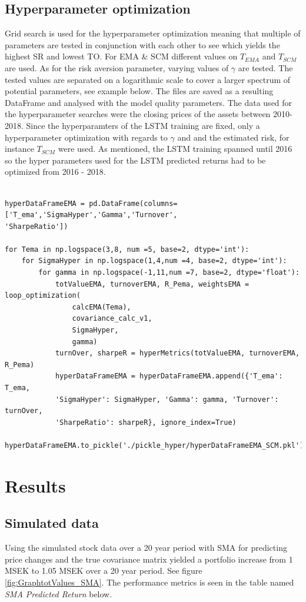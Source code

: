 \documentclass[final]{LTHtwocol} %
\begin{document}
\subsection{Hyperparameter optimization}
Grid search is used for the hyperparameter optimization meaning that multiple of parameters are tested in conjunction with each other to see which yields the highest SR and lowest TO. For EMA \& SCM different values on $T_{EMA}$ and $T_{SCM}$ are used. As for the risk aversion parameter, varying values of $\gamma$ are tested. The tested values are separated on a logarithmic scale to cover a larger spectrum of potential parameters, see example below. The files are saved as a resulting DataFrame and analysed with the model quality parameters. The data used for the hyperparameter searches were the closing prices of the assets between 2010-2018. 
Since the hyperparamters of the LSTM training are fixed, only a hyperparameter optimization with regards to $\gamma$ and and the estimated risk, for instance $T_{SCM}$ were used. As mentioned, the LSTM training spanned until 2016 so the hyper parameters used for the LSTM predicted returns had to be optimized from 2016 - 2018.

\begin{verbatim}
  
hyperDataFrameEMA = pd.DataFrame(columns=['T_ema','SigmaHyper','Gamma','Turnover',
'SharpeRatio'])

for Tema in np.logspace(3,8, num =5, base=2, dtype='int'):
    for SigmaHyper in np.logspace(1,4,num =4, base=2, dtype='int'):
        for gamma in np.logspace(-1,11,num =7, base=2, dtype='float'): 
            totValueEMA, turnoverEMA, R_Pema, weightsEMA = loop_optimization(
                calcEMA(Tema), 
                covariance_calc_v1, 
                SigmaHyper,
                gamma)
            turnOver, sharpeR = hyperMetrics(totValueEMA, turnoverEMA, R_Pema)
            hyperDataFrameEMA = hyperDataFrameEMA.append({'T_ema': T_ema,
            'SigmaHyper': SigmaHyper, 'Gamma': gamma, 'Turnover': turnOver,
            'SharpeRatio': sharpeR}, ignore_index=True)

hyperDataFrameEMA.to_pickle('./pickle_hyper/hyperDataFrameEMA_SCM.pkl')

\end{verbatim}


\section{Results}
\subsection{Simulated data}
Using the simulated stock data over a 20 year period with SMA for predicting price changes and the true covariance matrix yielded a portfolio increase from 1 MSEK to 1.05 MSEK over a 20 year period. See figure \ref{fig:GraphtotValues_SMA}. The performance metrics is seen in the table named \textit{SMA Predicted Return} below.
\end{document}
